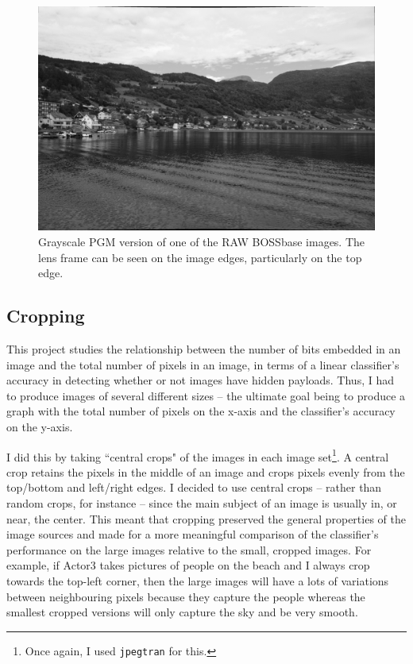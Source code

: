 \documentclass[11pt,a4paper,twoside,openright]{report}
\begin{document}
\begin{figure}[htbp] 
	\begin{center}
		\includegraphics[width=0.5\linewidth]{bossbase_image00031.jpg}
		\caption{Grayscale PGM version of one of the RAW BOSSbase images. The lens frame can be seen on the image edges, particularly on the top edge.}
		\label{bossbase-image-with-frame-lens}
	\end{center}
\end{figure}


\subsection{Cropping} \label{sec:cropping}
This project studies the relationship between the number of bits embedded in an image and the total number of pixels in an image, in terms of a linear classifier's accuracy in detecting whether or not images have hidden payloads. Thus, I had to produce images of several different sizes -- the ultimate goal being to produce a graph with the total number of pixels on the x-axis and the classifier's accuracy on the y-axis.

I did this by taking ``central crops" of the images in each image set\footnote{Once again, I used \texttt{jpegtran} for this.}. A central crop retains the pixels in the middle of an image and crops pixels evenly from the top/bottom and left/right edges. I decided to use central crops -- rather than random crops, for instance -- since the main subject of an image is usually in, or near, the center. This meant that cropping preserved the general properties of the image sources and made for a more meaningful comparison of the classifier's performance on the large images relative to the small, cropped images. For example, if Actor3 takes pictures of people on the beach and I always crop towards the top-left corner, then the large images will have a lots of variations between neighbouring pixels because they capture the people whereas the smallest cropped versions will only capture the sky and be very smooth.
\end{document}
